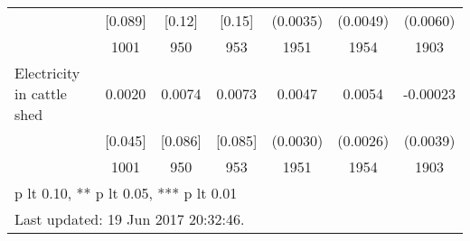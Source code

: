\begin{table}[htbp]
\begin{tabular*}{1\hsize}{@{\hskip\tabcolsep\extracolsep\fill}l*{1}{cccccc}}
                                &  [0.089]&   [0.12]&   [0.15]& (0.0035)         & (0.0049)         & (0.0060)         \\
                                &     1001&      950&      953&     1951         &     1954         &     1903         \\
Electricity in cattle shed      &   0.0020&   0.0074&   0.0073&   0.0047         &   0.0054\sym{**} & -0.00023         \\
                                &  [0.045]&  [0.086]&  [0.085]& (0.0030)         & (0.0026)         & (0.0039)         \\
                                &     1001&      950&      953&     1951         &     1954         &     1903         \\
\bottomrule
\multicolumn{7}{l}{\footnotesize * p lt 0.10, ** p lt 0.05, *** p lt 0.01}\\
\multicolumn{7}{l}{\footnotesize Last updated: 19 Jun 2017 20:32:46.}\\
\end{tabular*}
\end{table}
